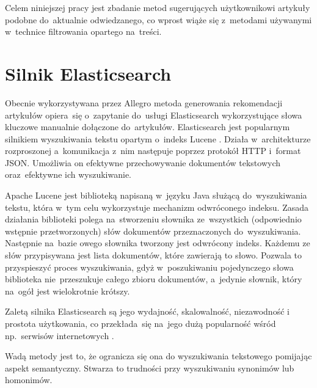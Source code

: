 \documentclass[pl]{minipw} %
\begin{document}
Celem niniejszej pracy jest zbadanie metod sugerujących użytkownikowi artykuły podobne do~aktualnie odwiedzanego, co wprost wiąże się z~metodami używanymi w~technice filtrowania opartego na~treści.

\section{Silnik Elasticsearch}

Obecnie wykorzystywana przez Allegro metoda generowania rekomendacji artykułów opiera~się o~zapytanie do~usługi Elasticsearch \cite{elastic} wykorzystujące słowa kluczowe manualnie dołączone do~artykułów. Elasticsearch jest popularnym silnikiem wyszukiwania tekstu opartym o~indeks Lucene \cite{lucene}. Działa w~architekturze rozproszonej a~komunikacja z~nim następuje poprzez protokół HTTP i~format JSON. Umożliwia on efektywne przechowywanie dokumentów tekstowych oraz~efektywne ich wyszukiwanie. 

Apache Lucene jest biblioteką napisaną w~języku Java służącą do~wyszukiwania tekstu, która w~tym celu wykorzystuje mechanizm odwróconego indeksu. Zasada działania biblioteki polega na~stworzeniu słownika ze~wszystkich (odpowiednio wstępnie przetworzonych) słów dokumentów przeznaczonych do~wyszukiwania. Następnie na~bazie owego słownika tworzony jest odwrócony indeks. Każdemu ze słów przypisywana jest lista dokumentów, które zawierają to słowo. Pozwala to przyspieszyć proces wyszukiwania, gdyż w~poszukiwaniu pojedynczego słowa biblioteka nie~przeszukuje całego zbioru dokumentów, a~jedynie słownik, który na~ogół jest wielokrotnie krótszy.

Zaletą silnika Elasticsearch są jego wydajność, skalowalność, niezawodność i prostota użytkowania, co przekłada~się na~jego dużą popularność wśród np.~serwisów internetowych \cite{elastic_companies}.

Wadą metody jest to, że ogranicza się ona do wyszukiwania tekstowego pomijając aspekt semantyczny. Stwarza to trudności przy wyszukiwaniu synonimów lub homonimów.%
\end{document}
